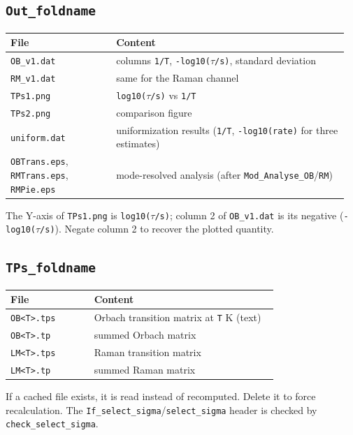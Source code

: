 \documentclass[11pt,a4paper]{article}
\providecommand{\texorpdfstring}[2]{#1}
\begin{document}
\subsection{\texorpdfstring{\texttt{Out\_foldname}}{8.1 Out\_foldname}}\label{out_foldname}

\begin{longtable}[]{@{}>{\raggedright\arraybackslash}p{0.30\linewidth} >{\raggedright\arraybackslash}p{0.66\linewidth}@{}}
\toprule
File\strut
 & Content\strut
\tabularnewline
\midrule
\endhead
\texttt{OB\_v1.dat}\strut
 & columns \texttt{1/T}, \texttt{-log10(\(\tau\)/s)}, standard deviation\strut
\tabularnewline
\texttt{RM\_v1.dat}\strut
 & same for the Raman channel\strut
\tabularnewline
\texttt{TPs1.png}\strut
 & \texttt{log10(\(\tau\)/s)} vs \texttt{1/T}\strut
\tabularnewline
\texttt{TPs2.png}\strut
 & comparison figure\strut
\tabularnewline
\texttt{uniform.dat}\strut
 & uniformization results (\texttt{1/T}, \texttt{-log10(rate)} for three
estimates)\strut
\tabularnewline
\texttt{OBTrans.eps}, \texttt{RMTrans.eps}, \texttt{RMPie.eps}\strut
 & mode-resolved analysis (after
\texttt{Mod\_Analyse\_OB}/\texttt{RM})\strut
\tabularnewline
\bottomrule
\end{longtable}

The Y-axis of \texttt{TPs1.png} is \texttt{log10(\(\tau\)/s)}; column 2 of
\texttt{OB\_v1.dat} is its negative (\texttt{-log10(\(\tau\)/s)}). Negate
column 2 to recover the plotted quantity.

\subsection{\texorpdfstring{\texttt{TPs\_foldname}}{8.2 TPs\_foldname}}\label{tps_foldname}

\begin{longtable}[]{@{}>{\raggedright\arraybackslash}p{0.30\linewidth} >{\raggedright\arraybackslash}p{0.66\linewidth}@{}}
\toprule
File & Content\tabularnewline
\midrule
\endhead
\texttt{OB\textless{}T\textgreater{}.tps} & Orbach transition matrix at
\texttt{T} K (text)\tabularnewline
\texttt{OB\textless{}T\textgreater{}.tp} & summed Orbach
matrix\tabularnewline
\texttt{LM\textless{}T\textgreater{}.tps} & Raman transition
matrix\tabularnewline
\texttt{LM\textless{}T\textgreater{}.tp} & summed Raman
matrix\tabularnewline
\bottomrule
\end{longtable}

If a cached file exists, it is read instead of recomputed. Delete it to
force recalculation. The
\texttt{If\_select\_sigma}/\texttt{select\_sigma} header is checked by
\texttt{check\_select\_sigma}.
\end{document}
